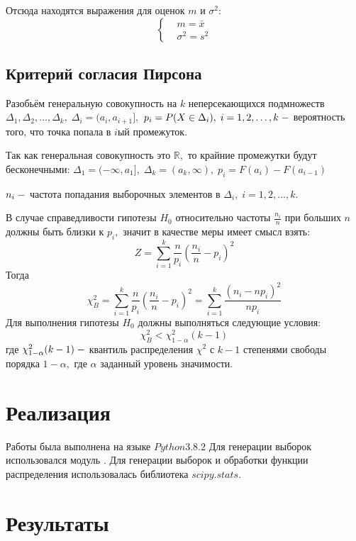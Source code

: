 \documentclass[a4]{article}
\begin{document}
Отсюда находятся выражения для оценок $m$ и $\sigma^2$:
\begin{equation}
\begin{cases}
&  m= \bar{x}\\ 
&  \sigma^{2} = s^{2}
\end{cases}
\end{equation}

\subsection{Критерий согласия Пирсона}
Разобьём генеральную совокупность на $k$ неперсекающихся подмножеств $\Delta_1, \Delta_2,\ldots, \Delta_k,\;\Delta_i = (a_i,a_{i+1}],$ $p_i = P(X\in\Delta_i),\;i=1,2,\ldots,k\; \--$ вероятность того, что точка попала в $i$ый промежуток.

Так как генеральная совокупность это $\mathbb{R},$ то крайние промежутки будут бесконечными: $\Delta_1=(-\infty,a_1],\;\Delta_k=(a_k,\infty),\;p_i = F(a_i)-F(a_{i-1})$

$n_i\;\--$ частота попадания выборочных элементов в $\Delta_i,\;i=1,2,\ldots,k.$

В случае справедливости гипотезы $H_0$ относительно частоты $\frac{n_i}{n}$ при больших $n$ должны быть близки к $p_i,$ значит в качестве меры имеет смысл взять: 
\begin{equation}
    Z = \sum\limits_{i=1}^k\frac{n}{p_i}\left(\frac{n_i}{n}-p_i\right)^2
\end{equation}
Тогда
\begin{equation}
    \chi^2_B=\sum\limits_{i=1}^k\frac{n}{p_i}\left(\frac{n_i}{n}-p_i\right)^2=\sum\limits_{i=1}^k\frac{(n_i-np_i)^2}{np_i}
\end{equation}
Для выполнения гипотезы $H_0$ должны выполняться следующие условия:
\begin{equation}
    \chi_B^2 < \chi_{1-\alpha}^2(k-1)
\end{equation}
где $\chi_{1-\alpha}^2(k-1)\;\--$ квантиль распределения $\chi^2$ с $k-1$ степенями свободы порядка $1-\alpha,$ где $\alpha$ заданный уровень значимости.
\section{Реализация}
Работы была выполнена на языке $Python 3.8.2$
Для генерации выборок использовался модуль .
Для генерации выборок и обработки функции распределения использовалась библиотека $scipy.stats$.

\section{Результаты}
\end{document}
